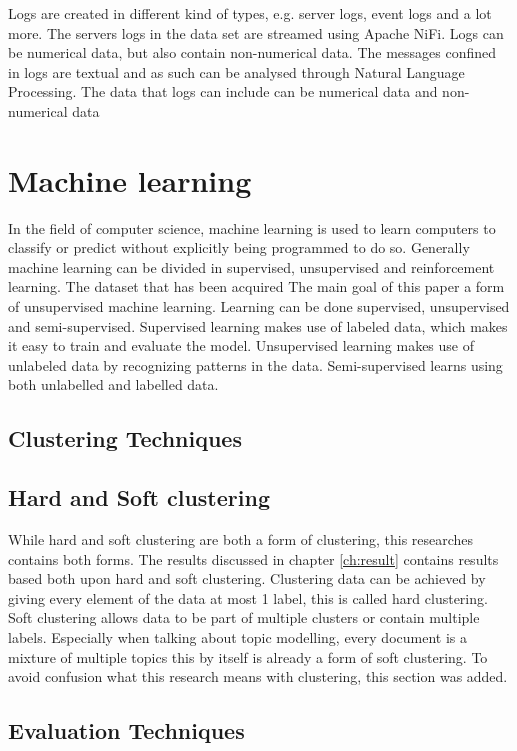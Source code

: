 Logs are created in different kind of types, e.g. server logs, event logs and a lot more. The servers logs in the data set are streamed using Apache NiFi. Logs can be numerical data, but also contain non-numerical data. The messages confined in logs are textual and as such can be analysed through Natural Language Processing.
The data that logs can include can be numerical data and non-numerical data



\section{Machine learning} \label{theory:machinelearning}
In the field of computer science, machine learning is used to learn computers to classify or predict without explicitly being programmed to do so. Generally machine learning can be divided in supervised, unsupervised and reinforcement learning. The dataset that has been acquired 
The main goal of this paper a form of unsupervised machine learning.
Learning can be done supervised, unsupervised and semi-supervised. Supervised learning makes use of labeled data, which makes it easy to train and evaluate the model. Unsupervised learning makes use of unlabeled data by recognizing patterns in the data. Semi-supervised learns using both unlabelled and labelled data.
 

\subsection{Clustering Techniques}

\subsection{Hard and Soft clustering}
While hard and soft clustering are both a form of clustering, this researches contains both forms. The results discussed in chapter \ref{ch:result} contains results based both upon hard and soft clustering. Clustering data can be achieved by giving every element of the data at most 1 label, this is called hard clustering. Soft clustering allows data to be part of multiple clusters or contain multiple labels. Especially when talking about topic modelling, every document is a mixture of multiple topics this by itself is already a form of soft clustering. To avoid confusion what this research means with clustering, this section was added.

\subsection{Evaluation Techniques}

